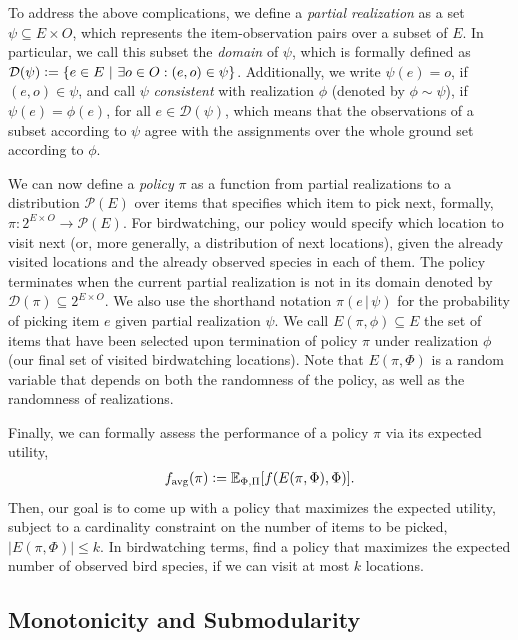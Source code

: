 \documentclass{article}
\newcommand{\defeq}{\vcentcolon=}
\let\originalleft\left
\let\originalright\right
\renewcommand{\left}{\mathopen{}\mathclose\bgroup\originalleft}
\renewcommand{\right}{\aftergroup\egroup\originalright}
\newcommand{\smid}{\ \middle\vert\ }
\newcommand{\mmid}{\,\vert\,}
\newcommand{\sdef}[2]{\left\{#1\smid#2\right\}}
\newcommand{\favg}{f_{\mathrm{avg}}}
\newcommand{\dom}{\mathcal{D}}
\begin{document}
To address the above complications, we define a \emph{partial realization} as a set $ \psi \subseteq E \times O$, which represents the item-observation pairs over a subset of $E$.
In particular, we call this subset the \emph{domain} of $\psi$, which is formally defined as $\dom(\psi) \defeq \sdef{e \in E}{\exists o \in O : (e, o) \in \psi}$.
Additionally, we write $\psi(e) = o$, if $(e, o) \in \psi$, and call $\psi$ \emph{consistent} with realization $\phi$ (denoted by $\phi \sim \psi$), if $\psi(e) = \phi(e)$, for all $e \in \dom(\psi)$, which means that the observations of a subset according to $\psi$ agree with the assignments over the whole ground set according to $\phi$.

We can now define a \emph{policy} $\pi$ as a function from partial realizations to a distribution $\mathcal{P}(E)$ over items that specifies which item to pick next, formally, $\pi : 2^{E \times O} \to \mathcal{P}(E)$. 
For birdwatching, our policy would specify which location to visit next (or, more generally, a distribution of next locations), given the already visited locations and the already observed species in each of them.
The policy terminates when the current partial realization is not in its domain denoted by $\dom(\pi) \subseteq 2^{E \times O}$.
We also use the shorthand notation $\pi(e\mmid\psi)$ for the probability of picking item $e$ given partial realization $\psi$.
We call $E(\pi, \phi) \subseteq E$ the set of items that have been selected upon termination of policy $\pi$ under realization $\phi$ (our final set of visited birdwatching locations).
Note that $E(\pi, \Phi)$ is a random variable that depends on both the randomness of the policy, as well as the randomness of realizations.

Finally, we can formally assess the performance of a policy $\pi$ via its expected utility,
\begin{align*}
  \favg(\pi) \defeq \E[\Phi,\Pi]{f(E(\pi, \Phi), \Phi)}.
\end{align*}
Then, our goal is to come up with a policy that maximizes the expected utility, subject to a cardinality constraint on the number of items to be picked, $|E(\pi, \Phi)| \leq k$.
In birdwatching terms, find a policy that maximizes the expected number of observed bird species, if we can visit at most $k$ locations.

\subsection{Monotonicity and Submodularity}
\end{document}
